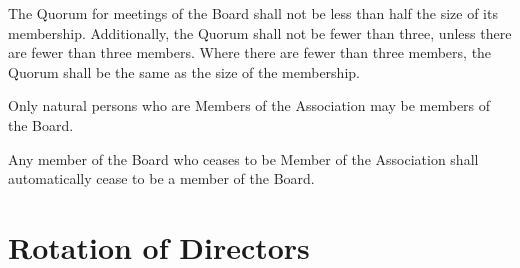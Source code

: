 \documentclass[12pt]{article}
\newcommand{\EC}[0]{Board}
\newcommand{\Exec}[0]{\EC{} }
\begin{document}
\begin{constenum}
  \item The Quorum for meetings of the \Exec shall not be less than
    half the size of its membership. Additionally, the Quorum shall
    not be fewer than three, unless there are fewer than three
    members. Where there are fewer than three members, the Quorum shall
    be the same as the size of the membership.

  \item Only natural persons who are Members of the Association
    may be members of the \EC{}.

  \item Any member of the \Exec who ceases to be Member of the Association
    shall automatically cease to be a member of the \EC{}.

  \end{constenum}


\section{Rotation of Directors}
\end{document}
